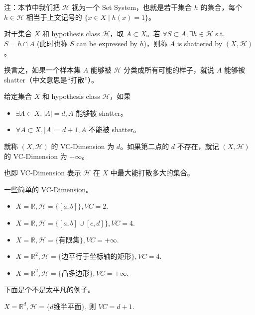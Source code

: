 注：本节中我们把 $\mathcal{H}$ 视为一个 Set System，也就是若干集合 $h$ 的集合，每个 $h \in \mathcal{H}$ 相当于上文记号的 $\{x \in X \mid h(x) = 1\}$。

\begin{definition}
    对于集合 $X$ 和 hypothesis class $\mathcal{H}$，取 $A \subset X$。若 $\forall S \subset A, \exists h \in \mathcal{H}$ s.t. $S = h \cap A$ (此时也称 $S$ can be expressed by $h$)，则称 $A$ is shattered by $(X, \mathcal{H})$。
\end{definition}

换言之，如果一个样本集 $A$ 能够被 $\mathcal{H}$ 分类成所有可能的样子，就说 $A$ 能够被 shatter（中文意思是“打散”）。

\begin{definition}
    给定集合 $X$ 和 hypothesis class $\mathcal{H}$，如果
    \begin{itemize}[noitemsep]
        \item $\exists A \subset X, |A|=d, A$ 能够被 shatter。
        \item $\forall A \subset X, |A|=d+1, A$ 不能被 shatter。
    \end{itemize}
    就称 $(X, \mathcal{H})$ 的 VC-Dimension 为 $d$。如果第二点的 $d$ 不存在，就记 $(X, \mathcal{H})$ 的 VC-Dimension 为 $+\infty$。
\end{definition}

也即 VC-Dimension 表示 $\mathcal{H}$ 在 $X$ 中最大能打散多大的集合。

\begin{example} 
    一些简单的 VC-Dimension。
    \begin{itemize}[noitemsep]
        \item $X=\mathbb{R}, \mathcal{H}=\{[a,b]\}, VC=2$.
        \item $X=\mathbb{R}, \mathcal{H}=\{[a,b] \cup [c,d]\}, VC=4$.
        \item $X=\mathbb{R}, \mathcal{H}=\{\text{有限集}\}, VC=+\infty$.
        \item $X=\mathbb{R}^2, \mathcal{H}=\{\text{边平行于坐标轴的矩形}\}, VC=4$.
        \item $X=\mathbb{R}^2, \mathcal{H}=\{\text{凸多边形}\}, VC=+\infty$.
    \end{itemize}
\end{example}

下面是个不是太平凡的例子。

\begin{theorem}
    $X=\mathbb{R}^d, \mathcal{H}=\{d\text{维半平面}\}$, 则 $VC=d+1$.
\end{theorem}

